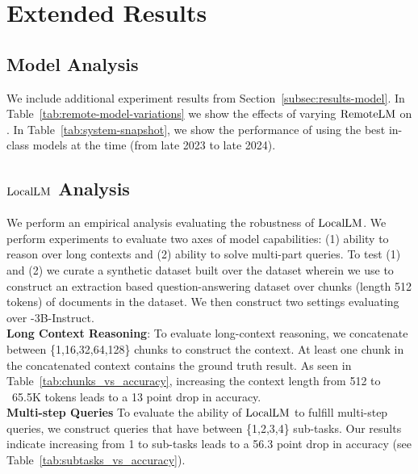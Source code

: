 \section{Extended Results}


\subsection{Model Analysis}\label{app:model_history}


We include additional experiment results from Section~\ref{subsec:results-model}. In Table~\ref{tab:remote-model-variations} we show the effects of varying $\mathrm{RemoteLM}$ on \system.  In Table~\ref{tab:system-snapshot}, we show the performance of \system using the best in-class models at the time (from late 2023 to late 2024).


\subsection{\naive $\mathrm{LocalLM}$ Analysis}

\label{app:naive-analysis}

We perform an empirical analysis evaluating the robustness of $\mathrm{LocalLM}$. We perform experiments to evaluate two axes of model capabilities: (1) ability to reason over long contexts and (2) ability to solve multi-part queries. To test (1) and (2) we curate a synthetic dataset built over the \finance dataset wherein we use \gpt to construct an extraction based question-answering dataset over chunks (length 512 tokens) of documents in the \finance dataset. We then construct two settings evaluating over \llamathreetwo-3B-Instruct.
\\

\textbf{Long Context Reasoning}: To evaluate long-context reasoning, we concatenate between \{1,16,32,64,128\} chunks to construct the context. At least one chunk in the concatenated context contains the ground truth result. As seen in Table~\ref{tab:chunks_vs_accuracy}, increasing the context length from 512 to ~65.5K tokens leads to a 13 point drop in accuracy.
\\

\textbf{Multi-step Queries} To evaluate the ability of $\mathrm{LocalLM}$ to fulfill multi-step queries, we construct queries that have between \{1,2,3,4\} sub-tasks. Our results indicate increasing from 1 to sub-tasks leads to a 56.3 point drop in accuracy (see Table~\ref{tab:subtasks_vs_accuracy}).




